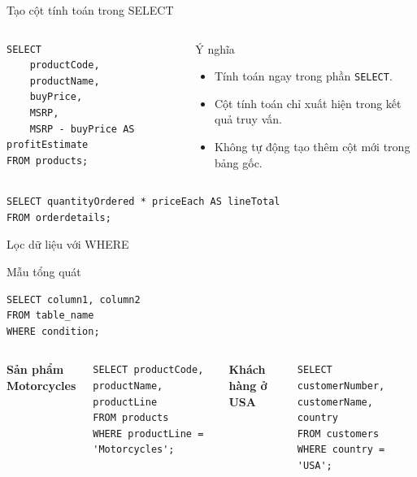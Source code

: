 \documentclass[aspectratio=169,11pt]{beamer}
\newcommand{\kw}[1]{\textcolor{sqlblue}{\texttt{#1}}}
\newcommand{\minihead}[1]{\vspace{2pt}\textbf{#1}\vspace{2pt}}
\begin{document}
\begin{frame}[fragile]{Tạo cột tính toán trong SELECT}
\begin{columns}[T]
\begin{lstlisting}
SELECT
    productCode,
    productName,
    buyPrice,
    MSRP,
    MSRP - buyPrice AS profitEstimate
FROM products;
\end{lstlisting}
\begin{block}{Ý nghĩa}
\begin{itemize}
  \item Tính toán ngay trong phần \kw{SELECT}.
  \item Cột tính toán chỉ xuất hiện trong kết quả truy vấn.
  \item Không tự động tạo thêm cột mới trong bảng gốc.
\end{itemize}
\end{block}
\end{columns}
\vspace{4pt}
\begin{lstlisting}
SELECT quantityOrdered * priceEach AS lineTotal
FROM orderdetails;
\end{lstlisting}
\end{frame}

\begin{frame}[fragile]{Lọc dữ liệu với WHERE}
\begin{block}{Mẫu tổng quát}
\begin{lstlisting}
SELECT column1, column2
FROM table_name
WHERE condition;
\end{lstlisting}
\end{block}
\begin{columns}[T]
\minihead{Sản phẩm Motorcycles}
\begin{lstlisting}
SELECT productCode, productName, productLine
FROM products
WHERE productLine = 'Motorcycles';
\end{lstlisting}
\minihead{Khách hàng ở USA}
\begin{lstlisting}
SELECT customerNumber, customerName, country
FROM customers
WHERE country = 'USA';
\end{lstlisting}
\end{columns}
\end{frame}
\end{document}
